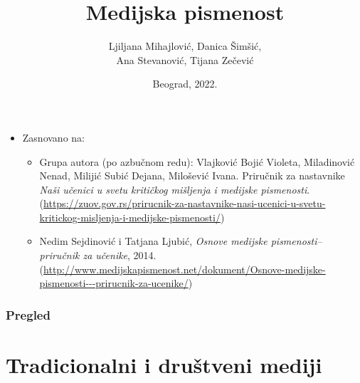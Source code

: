 \documentclass[13pt]{beamer}
\title{Medijska pismenost}
\author{Ljiljana Mihajlović, Danica Šimšić, \\ Ana Stevanović, Tijana Zečević}
\institute{Matematički fakultet \\Univerzitet u Beogradu}
\date{
	\footnotesize{Beograd, 2022.}	
}
\begin{document}
\begin{frame}
	\thispagestyle{empty}
	\titlepage
\end{frame}

\addtocounter{framenumber}{-1}

\begin{frame}
	\begin{itemize}
		\item Zasnovano na:\\
        \begin{itemize}
		\item Grupa autora (po azbučnom redu): Vlajković Bojić Violeta, Miladinović Nenad, Milijić Subić Dejana, Milošević Ivana. Priručnik za nastavnike \emph{ Naši učenici u svetu kritičkog mišljenja i medijske pismenosti}.
		(\url{https://zuov.gov.rs/prirucnik-za-nastavnike-nasi-ucenici-u-svetu-kritickog-misljenja-i-medijske-pismenosti/})


      \item  Nedim Sejdinović i Tatjana Ljubić, \emph{Osnove medijske pismenosti– priručnik za učenike}, 2014.
         (\url{http://www.medijskapismenost.net/dokument/Osnove-medijske-pismenosti---prirucnik-za-ucenike/})\\
           \end{itemize} 

	\end{itemize}
\end{frame}

\begin{frame}
	\frametitle{Pregled} %
	\tableofcontents[hidesubsections] 
\end{frame}

\section{Tradicionalni i društveni mediji}
\end{document}
